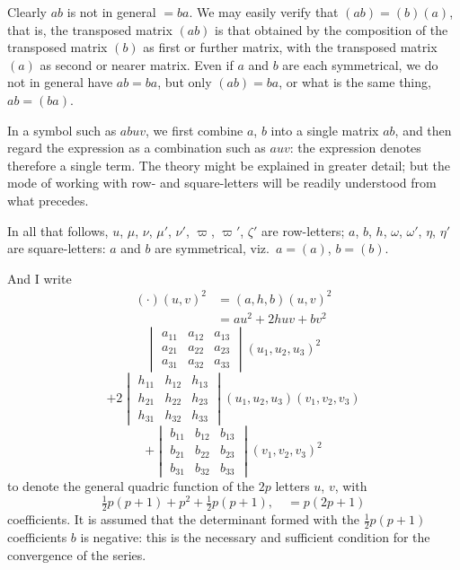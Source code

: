 \documentclass[11pt,a4paper]{article}
\begin{document}
Clearly $ab$ is not in general $= ba$.  We may easily verify that
$(ab) = (b)(a)$, that is, the transposed matrix $(ab)$ is that obtained by
the composition of the transposed matrix $(b)$ as first or further matrix,
with the transposed matrix $(a)$ as second or nearer matrix.  Even if $a$
and $b$ are each symmetrical, we do not in general have $ab = ba$, but only
$(ab) = ba$, or what is the same thing, $ab = (ba)$.

In a symbol such as $abuv$, we first combine $a$, $b$ into a single matrix
$ab$, and then regard the expression as a combination such as $auv$: the
expression denotes therefore a single term.  The theory might be explained
in greater detail; but the mode of working with row- and square-letters
will be readily understood from what precedes.

In all that follows, $u$, $\mu$, $\nu$, $\mu'$, $\nu'$, $\varpi$, $\varpi'$,
$\zeta'$ are row-letters; $a$, $b$, $h$, $\omega$, $\omega'$, $\eta$, $\eta'$
are square-letters: $a$ and $b$ are symmetrical, viz.\ $a = (a)$, $b = (b)$.

And I write
\begin{align*}
  (\cdot)(u, v)^{2} & = (a, h, b)(u, v)^{2} \\
   & = au^{2} + 2huv + bv^{2}
\end{align*}
\[
\begin{vmatrix}
  a_{11} & a_{12} & a_{13} \\ a_{21} & a_{22} & a_{23} \\ a_{31} & a_{32} & a_{33}
\end{vmatrix} (u_{1}, u_{2}, u_{3})^{2}
\]
\[
+ 2 \begin{vmatrix}
  h_{11} & h_{12} & h_{13} \\ h_{21} & h_{22} & h_{23} \\ h_{31} & h_{32} & h_{33}
\end{vmatrix} (u_{1}, u_{2}, u_{3})(v_{1}, v_{2}, v_{3})
\]
\[
+ \begin{vmatrix}
  b_{11} & b_{12} & b_{13} \\ b_{21} & b_{22} & b_{23} \\ b_{31} & b_{32} & b_{33}
\end{vmatrix} (v_{1}, v_{2}, v_{3})^{2}
\]
to denote the general quadric function of the $2p$ letters $u$, $v$, with
\[
  \tfrac{1}{2} p(p + 1) + p^{2} + \tfrac{1}{2} p(p + 1), \quad = p(2p + 1)
\]
coefficients.  It is assumed that the determinant formed with the
$\tfrac{1}{2} p(p + 1)$ coefficients $b$ is negative: this is the necessary
and sufficient condition for the convergence of the series.
\end{document}
